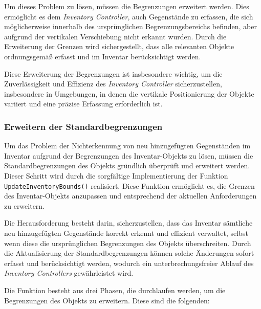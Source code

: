 Um dieses Problem zu lösen, müssen die Begrenzungen erweitert werden. Dies ermöglicht es dem \textit{Inventory Controller},
auch Gegenstände zu erfassen, die sich möglicherweise innerhalb des ursprünglichen Begrenzungsbereichs befinden, aber
aufgrund der vertikalen Verschiebung nicht erkannt wurden. Durch die Erweiterung der Grenzen wird sichergestellt, dass
alle relevanten Objekte ordnungsgemäß erfasst und im Inventar berücksichtigt werden.

Diese Erweiterung der Begrenzungen ist insbesondere wichtig, um die Zuverlässigkeit und Effizienz des \textit{Inventory Controller}
sicherzustellen, insbesondere in Umgebungen, in denen die vertikale Positionierung der Objekte variiert und eine präzise
Erfassung erforderlich ist.

\subsubsection{Erweitern der Standardbegrenzungen}
Um das Problem der Nichterkennung von neu hinzugefügten Gegenständen im Inventar aufgrund der Begrenzungen des Inventar-Objekts
zu lösen, müssen die Standardbegrenzungen des Objekts gründlich überprüft und erweitert werden. Dieser Schritt wird durch
die sorgfältige Implementierung der Funktion \texttt{UpdateInventoryBounds()} realisiert. Diese Funktion ermöglicht es,
die Grenzen des Inventar-Objekts anzupassen und entsprechend der aktuellen Anforderungen zu erweitern.

Die Herausforderung besteht darin, sicherzustellen, dass das Inventar sämtliche neu hinzugefügten Gegenstände korrekt
erkennt und effizient verwaltet, selbst wenn diese die ursprünglichen Begrenzungen des Objekts überschreiten. Durch die
Aktualisierung der Standardbegrenzungen können solche Änderungen sofort erfasst und berücksichtigt werden, wodurch ein
unterbrechungsfreier Ablauf des \textit{Inventory Controllers} gewährleistet wird.

Die Funktion besteht aus drei Phasen, die durchlaufen werden, um die Begrenzungen des Objekts zu erweitern. Diese sind
die folgenden:

